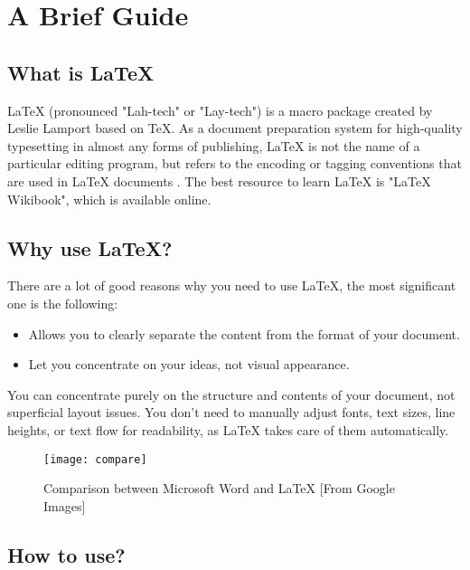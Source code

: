 \chapter{A Brief Guide}
\label{chap:guide}

\section{What is \LaTeX{}}

\LaTeX{} (pronounced "Lah-tech" or "Lay-tech") is a macro package created by Leslie Lamport based on \TeX{}. As a document preparation system for high-quality typesetting in almost any forms of publishing, \LaTeX{} is not the name of a particular editing program, but refers to the encoding or tagging conventions that are used in \LaTeX{} documents \citep{website:wikipedia,website:latex}. The best resource to learn \LaTeX{} is "\LaTeX{} Wikibook", which is available online.

\section{Why use \LaTeX?}

There are a lot of good reasons why you need to use \LaTeX{}, the most significant one is the following:
\begin{itemize}
    \item Allows you to clearly separate the content from the format of your document.
    \item Let you concentrate on your ideas, not visual appearance.
\end{itemize}

You can concentrate purely on the structure and contents of your document, not superficial layout issues. You don't need to manually adjust fonts, text sizes, line heights, or text flow for readability, as \LaTeX{} takes care of them automatically. \citep{website:wikibook}
\begin{figure}[!htbp]
    \centering
    \texttt{[image: compare]}
    \caption{Comparison between Microsoft Word and \LaTeX{} [From Google Images]}
    \label{fig:compare}
\end{figure}

\section{How to use?}


